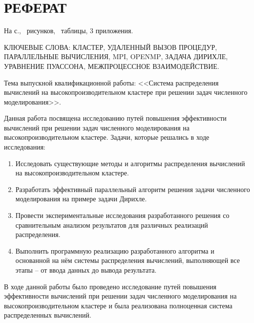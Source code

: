 \documentclass[a4paper,14pt,indentfirst]{extreport}
\newcommand{\EN}[1]{\foreignlanguage{english}{#1}}
\newcommand*\EmptyPage{\newpage\null\thispagestyle{empty}\newpage}
\providecommand\totfig{}
\providecommand\tottab{}
\begin{document}
\nocite{*}
\EmptyPage %
\EmptyPage\EmptyPage %
\newpage
\chapter*{РЕФЕРАТ}
На  с., \totfig\ рисунков, \tottab\ таблицы, 3 приложения.

КЛЮЧЕВЫЕ СЛОВА: КЛАСТЕР, УДАЛЕННЫЙ ВЫЗОВ ПРОЦЕДУР, ПАРАЛЛЕЛЬНЫЕ ВЫЧИСЛЕНИЯ, \EN{MPI, OPENMP}, ЗАДАЧА ДИРИХЛЕ, УРАВНЕНИЕ ПУАССОНА, МЕЖПРОЦЕССНОЕ ВЗАИМОДЕЙСТВИЕ.

Тема выпускной квалификационной работы: <<Система распределения вычислений на высокопроизводительном кластере при решении задач численного моделирования>>.

Данная работа посвящена исследованию путей повышения эффективности вычислений при решении задач численного моделирования на высокопроизводительном кластере. Задачи, которые решались в ходе исследования:
\begin{enumerate}
  \item Исследовать существующие методы и алгоритмы распределения вычислений на высокопроизводительном кластере.
  \item Разработать эффективный параллельный алгоритм решения задачи численного моделирования на примере задачи Дирихле.
  \item Провести экспериментальные исследования разработанного решения со сравнительным анализом результатов для различных реализаций распределения.
  \item Выполнить программную реализацию разработанного алгоритма и основанной на нём системы распределения вычислений, выполняющей все этапы – от ввода данных до вывода результата.
\end{enumerate}
В ходе данной работы было проведено исследование путей повышения эффективности вычислений при решении задач численного моделирования на высокопроизводительном кластере и была реализована полноценная система распределенных вычислений.
\end{document}
